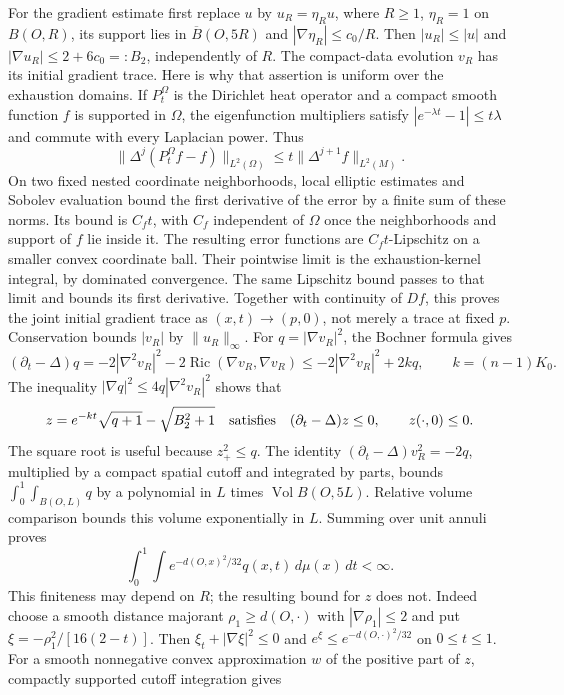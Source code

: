For the gradient estimate first replace $u$ by $u_R=\eta_Ru$,
where $R\geq1$, $\eta_R=1$ on $B(O,R)$, its support lies in
$\overline B(O,5R)$ and $|\nabla\eta_R|\leq c_0/R$.
Then $|u_R|\leq|u|$ and
$|\nabla u_R|\leq2+6c_0=:B_2$, independently of $R$.
The compact-data evolution $v_R$ has its initial gradient trace.
Here is why that assertion is uniform over the exhaustion domains.
If $P_t^\Omega$ is the Dirichlet heat operator and a compact smooth
function $f$ is supported in $\Omega$, the eigenfunction multipliers
satisfy $|e^{-\lambda t}-1|\leq t\lambda$ and commute with every
Laplacian power.  Thus
\[
 \|\Delta^j(P_t^\Omega f-f)\|_{L^2(\Omega)}
                          \leq t\|\Delta^{j+1}f\|_{L^2(M)}.
\]
On two fixed nested coordinate neighborhoods, local elliptic
estimates and Sobolev evaluation bound the first derivative of the
error by a finite sum of these norms.  Its bound is $C_f t$, with
$C_f$ independent of $\Omega$ once the neighborhoods and support of
$f$ lie inside it.  The resulting error functions are $C_f t$-Lipschitz
on a smaller convex coordinate ball.  Their pointwise limit is the
exhaustion-kernel integral, by dominated convergence.  The same
Lipschitz bound passes to that limit and bounds its first derivative.
Together with continuity of $Df$, this proves the joint initial
gradient trace as $(x,t)\to(p,0)$, not merely a trace at fixed $p$.
Conservation bounds $|v_R|$ by $\|u_R\|_\infty$.
For $q=|\nabla v_R|^2$, the Bochner formula gives
\[
 (\partial_t-\Delta)q
 =-2|\nabla^2v_R|^2-2\operatorname{Ric}(\nabla v_R,\nabla v_R)
 \leq-2|\nabla^2v_R|^2+2kq,\qquad k=(n-1)K_0.
\]
The inequality $|\nabla q|^2\leq4q|\nabla^2v_R|^2$ shows that
\[
 z=e^{-kt}\sqrt{q+1}-\sqrt{B_2^2+1}
 \quad\hbox{satisfies}\quad(\partial_t-\Delta)z\leq0,
 \qquad z(\cdot,0)\leq0.
\]
The square root is useful because $z_+^2\leq q$.
The identity $(\partial_t-\Delta)v_R^2=-2q$, multiplied by a
compact spatial cutoff and integrated by parts, bounds
$\int_0^1\int_{B(O,L)}q$ by a polynomial in $L$ times
$\operatorname{Vol}B(O,5L)$.  Relative volume comparison bounds
this volume exponentially in $L$.  Summing over unit annuli proves
\[
 \int_0^1\int e^{-d(O,x)^2/32}q(x,t)\,d\mu(x)\,dt<\infty.
\]
This finiteness may depend on $R$; the resulting bound for $z$ does
not.  Indeed choose a smooth distance majorant $\rho_1\geq d(O,\cdot)$
with $|\nabla\rho_1|\leq2$ and put
$\xi=-\rho_1^2/[16(2-t)]$.  Then
$\xi_t+|\nabla\xi|^2\leq0$ and
$e^\xi\leq e^{-d(O,\cdot)^2/32}$ on $0\leq t\leq1$.
For a smooth nonnegative convex approximation $w$ of the positive
part of $z$, compactly supported cutoff integration gives

